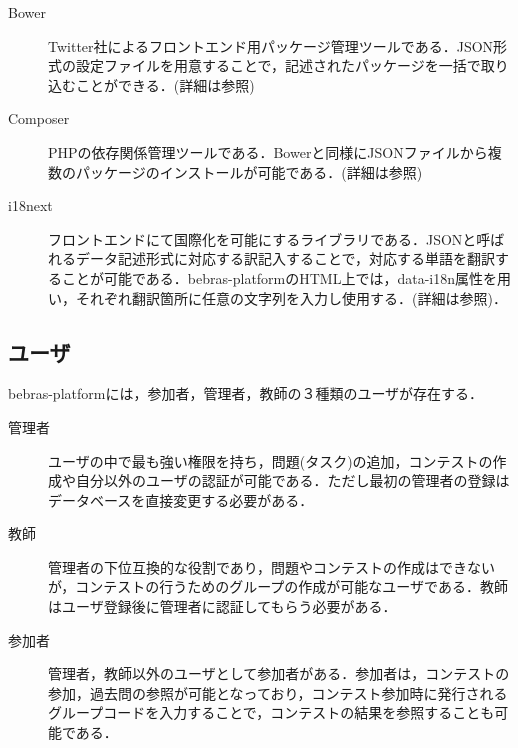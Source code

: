 \documentclass[a4paper]{jarticle}
\begin{document}
\begin{multicols}{2}
\begin{description}
\item[Bower]Twitter社によるフロントエンド用パッケージ管理ツールである．JSON形式の設定ファイルを用意することで，記述されたパッケージを一括で取り込むことができる．(詳細は\cite{bower}参照)
\end{description}

\begin{description}
\item[Composer] PHPの依存関係管理ツールである．Bowerと同様にJSONファイルから複数のパッケージのインストールが可能である．(詳細は\cite{composer}参照)
\end{description}

\begin{description}
\item[i18next] フロントエンドにて国際化を可能にするライブラリである．JSONと呼ばれるデータ記述形式に対応する訳記入することで，対応する単語を翻訳することが可能である．bebras-platformのHTML上では，data-i18n属性を用い，それぞれ翻訳箇所に任意の文字列を入力し使用する．(詳細は\cite{i18n}参照)．
\end{description}


\subsection{ユーザ}
bebras-platformには，参加者，管理者，教師の３種類のユーザが存在する．
\begin{description}
\item[管理者]  ユーザの中で最も強い権限を持ち，問題(タスク)の追加，コンテストの作成や自分以外のユーザの認証が可能である．ただし最初の管理者の登録はデータベースを直接変更する必要がある． 
\end{description}

\begin{description}
\item[教師] 管理者の下位互換的な役割であり，問題やコンテストの作成はできないが，コンテストの行うためのグループの作成が可能なユーザである．教師はユーザ登録後に管理者に認証してもらう必要がある．
\end{description}

\begin{description}
\item[参加者] 管理者，教師以外のユーザとして参加者がある．参加者は，コンテストの参加，過去問の参照が可能となっており，コンテスト参加時に発行されるグループコードを入力することで，コンテストの結果を参照することも可能である．
\end{description}





\end{multicols}
\end{document}
